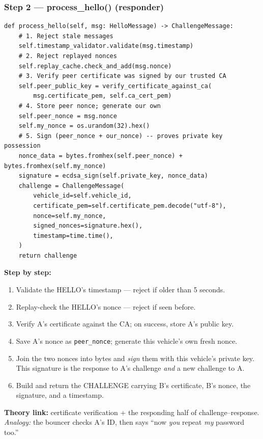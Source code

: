 \documentclass[11pt,a4paper]{report}
\begin{document}
\subsubsection*{Step 2 --- process\_hello() (responder)}
\begin{lstlisting}[style=py,caption={auth\_protocol.py --- Step 2: verify HELLO, build CHALLENGE.}]
def process_hello(self, msg: HelloMessage) -> ChallengeMessage:
    # 1. Reject stale messages
    self.timestamp_validator.validate(msg.timestamp)
    # 2. Reject replayed nonces
    self.replay_cache.check_and_add(msg.nonce)
    # 3. Verify peer certificate was signed by our trusted CA
    self.peer_public_key = verify_certificate_against_ca(
        msg.certificate_pem, self.ca_cert_pem)
    # 4. Store peer nonce; generate our own
    self.peer_nonce = msg.nonce
    self.my_nonce = os.urandom(32).hex()
    # 5. Sign (peer_nonce + our_nonce) -- proves private key possession
    nonce_data = bytes.fromhex(self.peer_nonce) + bytes.fromhex(self.my_nonce)
    signature = ecdsa_sign(self.private_key, nonce_data)
    challenge = ChallengeMessage(
        vehicle_id=self.vehicle_id,
        certificate_pem=self.certificate_pem.decode("utf-8"),
        nonce=self.my_nonce,
        signed_nonces=signature.hex(),
        timestamp=time.time(),
    )
    return challenge
\end{lstlisting}
\textbf{Step by step:}
\begin{enumerate}
  \item Validate the HELLO's timestamp --- reject if older than 5 seconds.
  \item Replay-check the HELLO's nonce --- reject if seen before.
  \item Verify A's certificate against the CA; on success, store A's public key.
  \item Save A's nonce as \texttt{peer\_nonce}; generate this vehicle's own fresh
        nonce.
  \item Join the two nonces into bytes and \emph{sign} them with this vehicle's
        private key. This signature is the response to A's challenge \emph{and}
        a new challenge to A.
  \item Build and return the CHALLENGE carrying B's certificate, B's nonce, the
        signature, and a timestamp.
\end{enumerate}
\textbf{Theory link:} certificate verification + the responding half of
challenge--response. \emph{Analogy:} the bouncer checks A's ID, then says ``now
\emph{you} repeat \emph{my} password too.''
\end{document}
